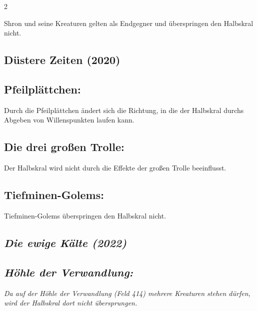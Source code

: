 \documentclass[10pt, a4paper, oneside]{book}
\newcommand{\fan}[1]{\textit{#1}}
\begin{document}
\begin{multicols*}{2}
\begin{bgcolor}[color-ag]
Shron und seine Kreaturen gelten als Endgegner und überspringen den Halbskral nicht.
\supercite{ag-begleitheft}

\end{bgcolor}




\begin{bgcolor}[color-dz]
\section{Düstere Zeiten (2020)}

\subsection{Pfeilplättchen:}

Durch die Pfeilplättchen ändert sich die Richtung, in die der Halbskral durchs Abgeben von Willenspunkten laufen kann.
\supercite{dz-begleitheft}


\subsection{Die drei großen Trolle:}

Der Halbskral wird nicht durch die Effekte der großen Trolle beeinflusst.
\supercite{dz-begleitheft}

\subsection{Tiefminen-Golems:}

Tiefminen-Golems überspringen den Halbskral nicht.
\supercite{dz-begleitheft}

\end{bgcolor}



\begin{bgcolor}
\section{\fan{Die ewige Kälte (2022)}}

\subsection{\fan{Höhle der Verwandlung:}}

\fan{Da auf der Höhle der Verwandlung (Feld 414) mehrere Kreaturen stehen dürfen, wird der Halbskral dort nicht übersprungen.} 

\end{bgcolor}





\end{multicols*}
\end{document}
